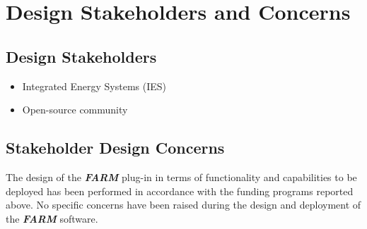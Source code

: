 \section{Design Stakeholders and Concerns}
\subsection{Design Stakeholders}
\begin{itemize}
  \item Integrated Energy Systems (IES)
  \item Open-source community 
\end{itemize}
\subsection{Stakeholder Design Concerns}
The design of the \textbf{\textit{FARM}} plug-in in terms of functionality and capabilities to be deployed has been performed in
accordance with the funding programs reported above. No specific concerns have been raised during the design and 
deployment of the \textbf{\textit{FARM}} software. 
